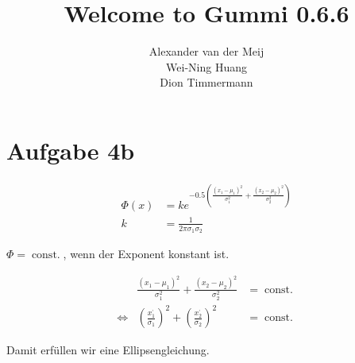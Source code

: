 \documentclass[
  bibliography=totoc,     %
  captions=tableheading,  %
  titlepage=firstiscover, %
  ngerman,
  a4paper
]{article}
\author{
  Thea Schneider%
  \texorpdfstring{
    \\
    \href{mailto:thea.schneider@udo.edu}{thea.schneider@udo.edu}
  }{}%
  \texorpdfstring{\and}{, }
  Max Pernklau%
  \texorpdfstring{
    \\
    \href{mailto:max.pernklau@udo.edu}{max.pernklau@udo.edu}
  }{}%
}
\title{\textbf{Welcome to Gummi 0.6.6}}
\author{Alexander van der Meij\\
		Wei-Ning Huang\\
		Dion Timmermann}
\date{}
\DeclareMathOperator{\const}{const.}
\begin{document}
\maketitle
































\section{Aufgabe 4b}

\begin{align}
	\Phi (x) &= k e^{-0.5 ( \frac{(x_1-\mu_1)^2}{\sigma_1^2} + \frac{(x_2-\mu_2)^2}{\sigma_2^2}) } \\
	k &= \frac{1}{2\pi \sigma_1 \sigma_2}
\end{align}

$\Phi = \const$, wenn der Exponent konstant ist.

\begin{align}
	& \frac{(x_1-\mu_1)^2}{\sigma_1^2} + \frac{(x_2-\mu_2)^2}{\sigma_2^2} &= \const \\
	\iff & (\frac{x_1^{,}}{\sigma_1})^2 + (\frac{x_2^{,}}{\sigma_2})^2 &= \const
\end{align}

Damit erfüllen wir eine Ellipsengleichung.
\end{document}
